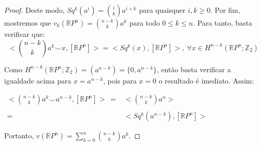 \documentclass[12pt,oneside]{book} %
\newcommand{\ds}{\displaystyle}
\newcommand{\RP}{\mathbb{R}P}
\newcommand{\Z}{\mathbb{Z}}
\newcommand{\ccup}{\smile}
\begin{document}
\begin{proof}
	\par Deste modo, $Sq^{k}(a^{i})=\binom{i}{k}a^{i+k}$ para quaisquer $i,k\geq 0$. Por fim, mostremos que $v_{k}(\RP^{n})=\binom{n-k}{k}a^{k}$ para todo $0\leq k\leq n$. Para tanto, basta verificar que:
	$$ <\binom{n-k}{k}a^{k}\ccup x,[\RP^{n}]>=<Sq^{k}(x),[\RP^{n}]>, \ \forall x\in H^{n-k}(\RP^{n};\Z_{2}) $$
	
	\par Como $H^{n-k}(\RP^{n};\Z_{2})=(a^{n-k})=\{ 0,a^{n-k} \}$, então basta verificar a igualdade acima para $x=a^{n-k}$, pois para $x=0$ o resultado é imediato. Assim: \newline 
	
	$\begin{array}{rl}
		<\binom{n-k}{k}a^{k}\ccup a^{n-k},[\RP^{n}]> \ = & <\binom{n-k}{k}a^{n}> \\
		& \\
		= & <Sq^{k}(a^{n-k}),[\RP^{n}]>
	\end{array}$ \newline 
	
	\par Portanto, $v(\RP^{n})=\ds\sum_{k=0}^{n}\binom{n-k}{k}a^{k}$.
	
\end{proof}
\end{document}
